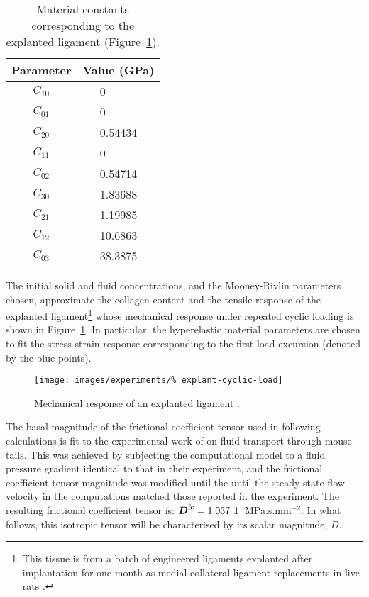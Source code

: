 \begin{table}[!hptb]
  \centering
  \begin{tabular}{|c|c|}
    \hline Parameter & Value (GPa) \\
    \hline \hline
    $C_{10}$  &   0$\phantom{.00000}$  \\
    $C_{01}$  &   0$\phantom{.00000}$  \\
    $C_{20}$  &   0.54434  \\
    $C_{11}$  &   0$\phantom{.00000}$  \\
    $C_{02}$  &   0.54714  \\
    $C_{30}$  &   1.83688  \\
    $C_{21}$  &   1.19985  \\
    $C_{12}$  &   10.6863  \\
    $C_{03}$  &   38.3875  \\
    \hline
  \end{tabular}
  \caption{Material constants corresponding to the explanted
    ligament (Figure~\ref{explanted-ligament}).}
  \label{parameters-explant}
\end{table}

The initial solid and fluid concentrations, and the Mooney-Rivlin
parameters chosen, approximate the collagen content and the tensile
response of the explanted ligament\footnote{This tissue is from a
  batch of engineered ligaments explanted after implantation for one
  month as medial collateral ligament replacements in live rats
  \citep{Syed-Picard:06}.} whose mechanical response under repeated
cyclic loading is shown in Figure~\ref{explanted-ligament}. In
particular, the hyperelastic material parameters are chosen to fit the
stress-strain response corresponding to the first load excursion
(denoted by the blue points).

\begin{figure}[!hptb]
  \centering
  \texttt{[image: images/experiments/\%
    explant-cyclic-load]}
  \caption{Mechanical response of an explanted ligament
    \citep{Syed-Picard:06}.}
  \label{explanted-ligament}
\end{figure}

The basal magnitude of the frictional coefficient tensor used in
following calculations is fit to the experimental work of
\citet{Swartzetal:99} on fluid transport through mouse tails. This was
achieved by subjecting the computational model to a fluid pressure
gradient identical to that in their experiment, and the frictional
coefficient tensor magnitude was modified until the until the
steady-state flow velocity in the computations matched those reported
in the experiment. The resulting frictional coefficient tensor is:
$\bD^{\mathrm{fc}} = 1.037 \ \bone$~MPa.s.mm$^{-2}$. In what follows,
this isotropic tensor will be characterised by its scalar magnitude,
$D$.

